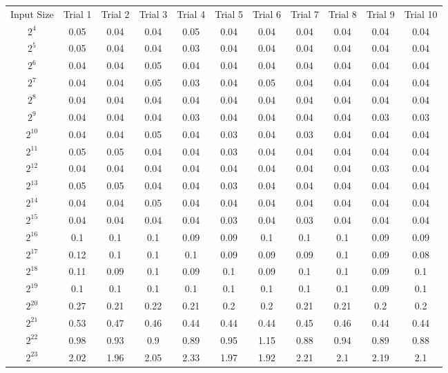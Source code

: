 \begin{center}
 \begin{tabular}
        {c|c|c|c|c|c|c|c|c|c|c}
        Input Size & Trial 1 & Trial 2 & Trial 3 & Trial 4 & Trial 5 & Trial 6 & Trial 7 & Trial 8 & Trial 9 & Trial 10 \\
$2^{4}$ & 0.05 & 0.04 & 0.04 & 0.05 & 0.04 & 0.04 & 0.04 & 0.04 & 0.04 & 0.04 \\ 
$2^{5}$ & 0.05 & 0.04 & 0.04 & 0.03 & 0.04 & 0.04 & 0.04 & 0.04 & 0.04 & 0.04 \\ 
$2^{6}$ & 0.04 & 0.04 & 0.05 & 0.04 & 0.04 & 0.04 & 0.04 & 0.04 & 0.04 & 0.04 \\ 
$2^{7}$ & 0.04 & 0.04 & 0.05 & 0.03 & 0.04 & 0.05 & 0.04 & 0.04 & 0.04 & 0.04 \\ 
$2^{8}$ & 0.04 & 0.04 & 0.04 & 0.04 & 0.04 & 0.04 & 0.04 & 0.04 & 0.04 & 0.04 \\ 
$2^{9}$ & 0.04 & 0.04 & 0.04 & 0.03 & 0.04 & 0.04 & 0.04 & 0.04 & 0.03 & 0.03 \\ 
$2^{10}$ & 0.04 & 0.04 & 0.05 & 0.04 & 0.03 & 0.04 & 0.03 & 0.04 & 0.04 & 0.04 \\ 
$2^{11}$ & 0.05 & 0.05 & 0.04 & 0.04 & 0.03 & 0.04 & 0.04 & 0.04 & 0.04 & 0.04 \\ 
$2^{12}$ & 0.04 & 0.04 & 0.04 & 0.04 & 0.04 & 0.04 & 0.04 & 0.04 & 0.03 & 0.04 \\ 
$2^{13}$ & 0.05 & 0.05 & 0.04 & 0.04 & 0.03 & 0.04 & 0.04 & 0.04 & 0.04 & 0.04 \\ 
$2^{14}$ & 0.04 & 0.04 & 0.05 & 0.04 & 0.04 & 0.04 & 0.04 & 0.04 & 0.04 & 0.04 \\ 
$2^{15}$ & 0.04 & 0.04 & 0.04 & 0.04 & 0.03 & 0.04 & 0.03 & 0.04 & 0.04 & 0.04 \\ 
$2^{16}$ & 0.1 & 0.1 & 0.1 & 0.09 & 0.09 & 0.1 & 0.1 & 0.1 & 0.09 & 0.09 \\ 
$2^{17}$ & 0.12 & 0.1 & 0.1 & 0.1 & 0.09 & 0.09 & 0.09 & 0.1 & 0.09 & 0.08 \\ 
$2^{18}$ & 0.11 & 0.09 & 0.1 & 0.09 & 0.1 & 0.09 & 0.1 & 0.1 & 0.09 & 0.1 \\ 
$2^{19}$ & 0.1 & 0.1 & 0.1 & 0.1 & 0.1 & 0.1 & 0.1 & 0.1 & 0.09 & 0.1 \\ 
$2^{20}$ & 0.27 & 0.21 & 0.22 & 0.21 & 0.2 & 0.2 & 0.21 & 0.21 & 0.2 & 0.2 \\ 
$2^{21}$ & 0.53 & 0.47 & 0.46 & 0.44 & 0.44 & 0.44 & 0.45 & 0.46 & 0.44 & 0.44 \\ 
$2^{22}$ & 0.98 & 0.93 & 0.9 & 0.89 & 0.95 & 1.15 & 0.88 & 0.94 & 0.89 & 0.88 \\ 
$2^{23}$ & 2.02 & 1.96 & 2.05 & 2.33 & 1.97 & 1.92 & 2.21 & 2.1 & 2.19 & 2.1 \\ 

\end{tabular}
\end{center}
